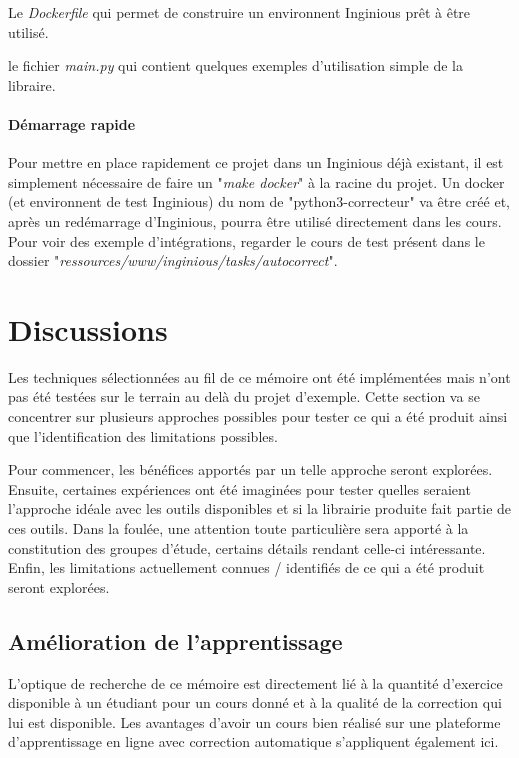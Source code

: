 \documentclass[a4paper]{report}
\begin{document}
Le \textit{Dockerfile} qui permet de construire un environnent Inginious prêt à être utilisé.

le fichier \textit{main.py} qui contient quelques exemples d'utilisation simple de la libraire.

\subsubsection{Démarrage rapide}

Pour mettre en place rapidement ce projet dans un Inginious déjà existant, il est simplement nécessaire de faire un "\textit{make docker}" à la racine du projet.
Un docker (et environnent de test Inginious) du nom de "python3-correcteur" va être créé et, après un redémarrage d'Inginious, pourra être utilisé directement dans les cours.
Pour voir des exemple d'intégrations, regarder le cours de test présent dans le dossier "\textit{ressources/www/inginious/tasks/autocorrect}".

\chapter{Discussions}

Les techniques sélectionnées au fil de ce mémoire ont été implémentées mais n'ont pas été testées sur le terrain au delà du projet d'exemple.
Cette section va se concentrer sur plusieurs approches possibles pour tester ce qui a été produit ainsi que l'identification des limitations possibles.

Pour commencer, les bénéfices apportés par un telle approche seront explorées.
Ensuite, certaines expériences ont été imaginées pour tester quelles seraient l'approche idéale avec les outils disponibles et si la librairie produite fait partie de ces outils.
Dans la foulée, une attention toute particulière sera apporté à la constitution des groupes d'étude, certains détails rendant celle-ci intéressante.
Enfin, les limitations actuellement connues / identifiés de ce qui a été produit seront explorées.

\section{Amélioration de l'apprentissage}

L'optique de recherche de ce mémoire est directement lié à la quantité d'exercice disponible à un étudiant pour un cours donné et à la qualité de la correction qui lui est disponible.
Les avantages d'avoir un cours bien réalisé sur une plateforme d'apprentissage en ligne avec correction automatique s'appliquent également ici.
\end{document}
